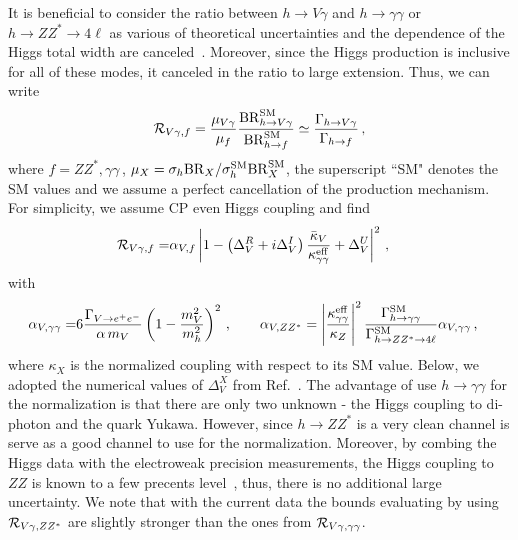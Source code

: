 \documentclass[../report.tex]{subfiles}
\begin{document}
It is beneficial to consider the ratio between $h\to V\gamma$ and $h\to\gamma\gamma$ or $h\to ZZ^*\to4\ell$ as various of theoretical uncertainties and the dependence of the Higgs total width are canceled~\cite{Perez:2015aoa,Koenig:2015pha}. Moreover, since the Higgs production is inclusive for all of these modes, it canceled in the ratio to large extension. Thus, we can write 
% 
\begin{align}
	\mathcal{R}_{V\gamma,f} 
=	\frac{\mu_{V\gamma} }{\mu_{f}}  \frac{ {\rm BR}^{\rm SM}_{h\to V\gamma}}{ {\rm BR}^{\rm SM}_{h\to f}}  
	\simeq  
	\frac{\Gamma_{h\to V\gamma}}{ \Gamma_{h\to f}}  \, ,
\end{align}
%
where $f=ZZ^*, \gamma\gamma\,$, $\mu_X = \sigma_h {\rm BR}_{X}/\sigma^{\rm SM}_h {\rm BR}^{\rm SM}_{X}$, the superscript ``SM" denotes the SM values and we assume a perfect cancellation of the production mechanism. 
For simplicity, we assume CP even Higgs coupling and find 
%
\begin{align}
	\mathcal{R}_{V\gamma,f} 
=& 	\alpha_{V,f} \left\lvert1 - \left(\Delta^R_V+ i \Delta^I_V \right)\frac{\bar{\kappa}_V}{\kappa^{\rm eff}_{\gamma\gamma}} + \Delta^U_V\right\rvert^2  \, , 	
\end{align}
%
with
%
\begin{align}	
	\alpha_{V,\gamma\gamma}
=&	6\frac{\Gamma_{V\to e^+e^-}}{\alpha \, m_V} \left( 1 - \frac{m^2_V}{m^2_h} \right)^2 \, , \quad\quad
%
	\alpha_{V,ZZ^*}
= \abs{\frac{\kappa^{\rm eff}_{\gamma\gamma}}{\kappa_{Z}}}^2  \frac{\Gamma^{\rm SM}_{h\to\gamma\gamma}}{\Gamma^{\rm SM}_{h\to ZZ^*\to 4\ell}}\alpha_{V,\gamma\gamma} \, ,
\end{align}
%
where $\kappa_X$ is the normalized coupling with respect to its SM value. Below, we adopted the numerical values of $\Delta^X_V$ from Ref.~\cite{Koenig:2015pha}.
The advantage of use $h\to\gamma\gamma$ for the normalization is that there are only two unknown - the Higgs coupling to di-photon and the quark Yukawa. 
However, since $h\to ZZ^*$ is a very clean channel is serve as a good channel to use for the normalization. 
Moreover, by combing the Higgs data with the electroweak precision measurements, the Higgs coupling to $ZZ$ is known to a few precents level~\cite{Falkowski:2013dza,deBlas:2016ojx}, thus, there is no additional large uncertainty.  
We note that with the current data the bounds evaluating by using $\mathcal{R}_{V\gamma,ZZ^*}$ are slightly stronger than the ones from $\mathcal{R}_{V\gamma,\gamma\gamma}$. 
\end{document}

